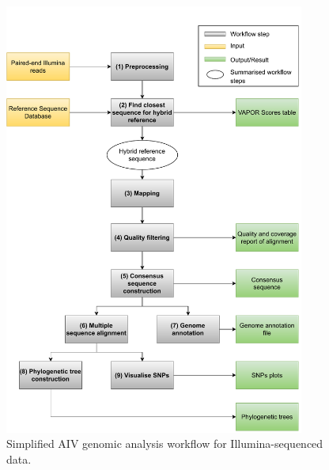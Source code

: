 \begin{figure}[ht!]
	\includegraphics[width=0.88\textwidth]{media/3-aiv.pdf}
	\caption{Simplified \ac{AIV} genomic analysis workflow for Illumina-sequenced data.}
	\label{fig:3-aiv-wf}
\end{figure}


